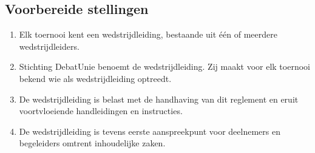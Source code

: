 \subsection{Voorbereide stellingen}

\begin{enumerate}
\item Elk toernooi kent een wedstrijdleiding, bestaande uit één of meerdere wedstrijdleiders.
\item Stichting DebatUnie benoemt de wedstrijdleiding. Zij maakt voor elk toernooi bekend wie als wedstrijdleiding optreedt.
\item De wedstrijdleiding is belast met de handhaving van dit reglement en eruit voortvloeiende handleidingen en instructies. 
\item De wedstrijdleiding is tevens eerste aanspreekpunt voor deelnemers en begeleiders omtrent inhoudelijke zaken.
\end{enumerate}
